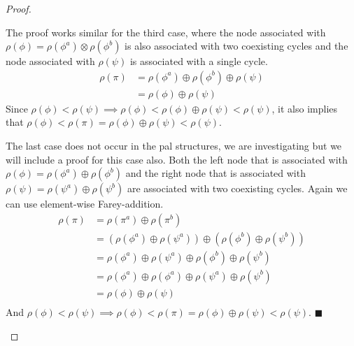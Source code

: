\begin{proof}
\begin{itemize}
			The proof works similar for the third case, where the node associated with $\rho(\phi) = \rho(\phi^a) \otimes \rho(\phi^b)$ is also associated with two coexisting cycles and the node associated with $\rho(\psi)$ is associated with a single cycle.
			\begin{align*}
				\rho(\pi) & = \rho(\phi^a) \oplus \rho(\phi^b) \oplus \rho(\psi) \\
				          & = \rho(\phi) \oplus \rho(\psi)
			\end{align*}
			Since $\rho(\phi) < \rho(\psi) \implies \rho(\phi) < \rho(\phi) \oplus \rho(\psi) < \rho(\psi)$, it also implies that $ \rho(\phi) < \rho(\pi) = \rho(\phi) \oplus \rho(\psi) < \rho(\psi)$.

			The last case does not occur in the \gls{pal} structures, we are investigating but we will include a proof for this case also.
			Both the left node that is associated with $\rho(\phi) = \rho(\phi^a) \oplus \rho(\phi^b)$ and the right node that is associated with $\rho(\psi) = \rho(\psi^a) \oplus \rho(\psi^b)$ are associated with two coexisting cycles.
			Again we can use element-wise Farey-addition.
			\begin{align*}
				\rho(\pi) & = \rho(\pi^a) \oplus \rho(\pi^b)                                                                     \\
				          & = \left(\rho(\phi^a) \oplus \rho(\psi^a)\right) \oplus \left(\rho(\phi^b) \oplus \rho(\psi^b)\right) \\
				          & = \rho(\phi^a) \oplus \rho(\psi^a) \oplus \rho(\phi^b) \oplus \rho(\psi^b)                           \\
				          & = \rho(\phi^a) \oplus \rho(\phi^a) \oplus \rho(\psi^a) \oplus \rho(\psi^b)                           \\
				          & = \rho(\phi) \oplus \rho(\psi)                                                                       \\
			\end{align*}
			And $\rho(\phi) < \rho(\psi) \implies \rho(\phi) < \rho(\pi) = \rho(\phi) \oplus \rho(\psi) < \rho(\psi)$.
			\hfill $\blacksquare$
	\end{itemize}
\end{proof}
